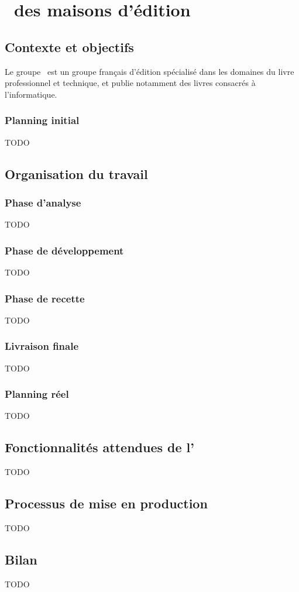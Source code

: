 \section{\aintranet\ des maisons d'édition \aey}

\subsection{Contexte et objectifs}

Le groupe \aey\ est un groupe français d'édition spécialisé dans les domaines du livre professionnel et technique, et publie notamment des livres consacrés à l'informatique.

\subsubsection{Planning initial}

TODO

\subsection{Organisation du travail}

\subsubsection{Phase d'analyse}

TODO

\subsubsection{Phase de développement}

TODO

\subsubsection{Phase de recette}

TODO

\subsubsection{Livraison finale}

TODO

\subsubsection{Planning réel}

TODO

\subsection{Fonctionnalités attendues de l'\aintranet}
\label{section:eyrolles_fct}

TODO









\subsection{Processus de mise en production}

TODO

\subsection{Bilan}

TODO
